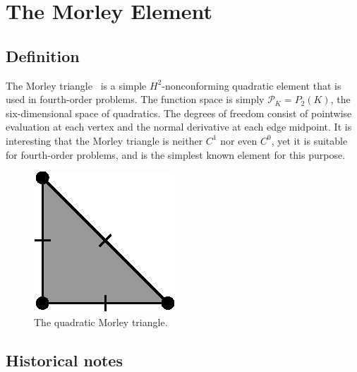 
\newpage

\section{The Morley Element}

\subsection{Definition}

The Morley triangle~\cite{Morley1968} is a simple \( H^2
\)-nonconforming quadratic element that is used in fourth-order
problems.  The function space is simply \( \mathcal{P}_K = P_2(K) \),
the six-dimensional space of quadratics.  The degrees of freedom
consist of pointwise evaluation at each vertex and the normal
derivative at each edge midpoint. It is interesting that the Morley
triangle is neither \( C^1 \) nor even \( C^0 \), yet it is suitable
for fourth-order problems, and is the simplest known element for this
purpose.

\begin{figure}[H]
  \begin{center}
    \includegraphics[width=\smallwidth]{chapters/kirby-6/eps/MOR2.eps}
    \caption{The quadratic Morley triangle.}
  \end{center}
\end{figure}

\subsection{Historical notes}

